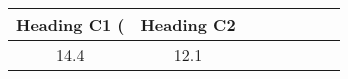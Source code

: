 \begin{tabular}{cccccccc}
{Heading C1 (} & {Heading C2} \\ \midrule
{14.4} & {12.1} \\
\end{tabular}